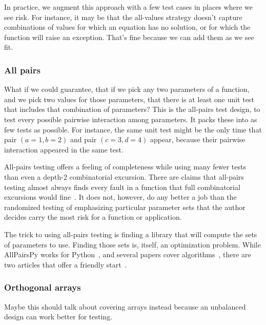\documentclass[fleqn,10pt]{olplainarticle}
\begin{document}
In practice, we augment this approach with a few test cases
in places where we see risk. For instance, it may be that
the all-values strategy doesn't capture combinations of
values for which an equation has no solution, or for which
the function will raise an exception. That's fine because
we can add them as we see fit.


\subsubsection{All pairs}


What if we could guarantee, that if we pick any two parameters
of a function, and we pick two values for those parameters,
that there is at least one unit test that includes that combination
of parameters? This is the all-pairs test design, to test
every possible pairwise interaction among parameters.
It packs these into as few tests as possible. For instance,
the same unit test might be the only time that pair
$(a=1, b=2)$ and pair $(c=3, d=4)$ appear, because their
pairwise interaction appeared in the same test.

All-pairs testing offers a feeling of completeness while
using many fewer tests than even a depth-2 combinatorial
excursion. There are claims that all-pairs testing almost
always finds every fault in a function that full combinatorial
excursions would fine~\citep{Pairwise}. It does not, however,
do any better a job than the randomized testing of emphasizing
particular parameter sets that the author decides carry
the most risk for a function or application.

The trick to using all-pairs testing is finding a library
that will compute the sets of parameters to use. Finding
those sets is, itself, an optimization problem.
While AllPairsPy works for Python~\citep{allpairspy},
and several papers cover algorithms~\citep{tung2000automating,pezze2008},
there are two articles that offer a friendly start~\citep{blass2002,czerwoka2006}.


\subsubsection{Orthogonal arrays}

Maybe this should talk about covering arrays instead because
an unbalanced design can work better for testing.
\end{document}
